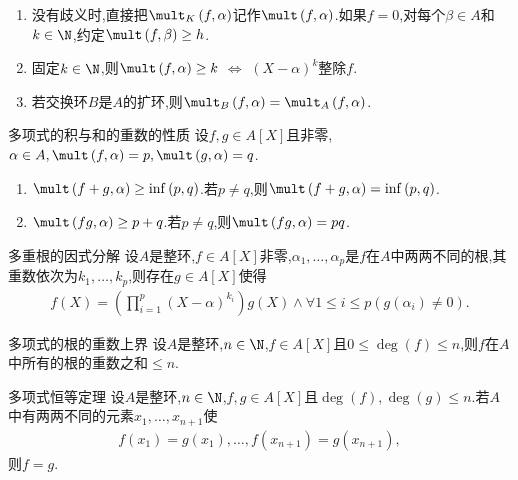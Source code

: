 \begin{remark}{}{}
	\begin{enumerate}
		\item 没有歧义时,直接把$\mult_{K}\left(f,\alpha\right)$记作$\mult\left(f,\alpha\right)$.如果$f=0$,对每个$\beta\in A$和$k\in\N$,约定$\mult\left(f,\beta\right)\geq h$.
		\item 固定$k\in\N$,则$\mult\left(f,\alpha\right)\geq k$ $\iff$ $\left(X-\alpha\right)^{k}$整除$f$.
		\item 若交换环$B$是$A$的扩环,则$\mult_{B}\left(f,\alpha\right)=\mult_{A}\left(f,\alpha\right)$.
	\end{enumerate}
\end{remark}

\begin{proposition}{多项式的积与和的重数的性质}{}
	设$f,g\in A\left[X\right]$且非零,$\alpha\in A,\mult\left(f,\alpha\right)=p,\mult\left(g,\alpha\right)=q$.
	\begin{enumerate}
		\item $\mult\left(f+g,\alpha\right)\geq\inf\left(p,q\right)$.若$p\neq q$,则$\mult\left(f+g,\alpha\right)=\inf\left(p,q\right)$.
		\item $\mult\left(fg,\alpha\right)\geq p+q$.若$p\neq q$,则$\mult\left(fg,\alpha\right)=pq$.
	\end{enumerate}
\end{proposition}

\begin{proposition}{多重根的因式分解}{}
	设$A$是整环,$f\in A\left[X\right]$非零,$\alpha_{1},\ldots,\alpha_{p}$是$f$在$A$中两两不同的根,其重数依次为$k_{1},\ldots,k_{p}$,则存在$g\in A\left[X\right]$使得
	\begin{align*}
		f\left(X\right)=\left(\prod\limits_{i=1}^{p}\left(X-\alpha\right)^{k_{i}}\right)g\left(X\right)\wedge\forall 1\leq i\leq p\left(g\left(\alpha_{i}\right)\neq 0\right).
	\end{align*}
\end{proposition}

\begin{theorem}{多项式的根的重数上界}{}
	设$A$是整环,$n\in\N$,$f\in A\left[X\right]$且$0\leq\deg\left(f\right)\leq n$,则$f$在$A$中所有的根的重数之和$\leq n$.
\end{theorem}

\begin{corollary}{多项式恒等定理}{}
	设$A$是整环,$n\in\N$,$f,g\in A\left[X\right]$且$\deg\left(f\right),\deg\left(g\right)\leq n$.若$A$中有两两不同的元素$x_{1},\ldots,x_{n+1}$使
	\begin{align*}
		f\left(x_{1}\right)=g\left(x_{1}\right),\ldots,f\left(x_{n+1}\right)=g\left(x_{n+1}\right),
	\end{align*}
	则$f=g$.
\end{corollary}


